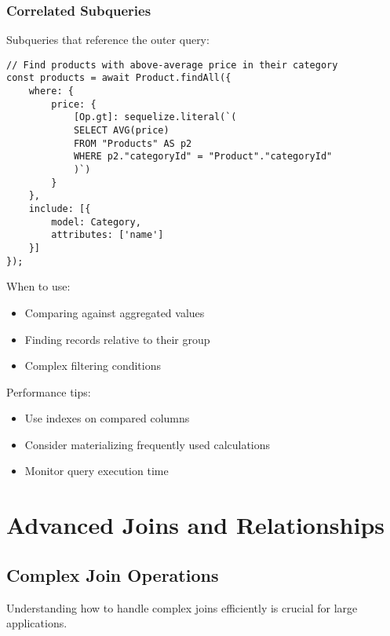 \documentclass[12pt,a4paper]{book}
\begin{document}
	\subsubsection{Correlated Subqueries}
	\begin{tcolorbox}[title=Correlated Subqueries]
		Subqueries that reference the outer query:
		
		\begin{verbatim}
// Find products with above-average price in their category
const products = await Product.findAll({
	where: {
		price: {
			[Op.gt]: sequelize.literal(`(
			SELECT AVG(price)
			FROM "Products" AS p2
			WHERE p2."categoryId" = "Product"."categoryId"
			)`)
		}
	},
	include: [{
		model: Category,
		attributes: ['name']
	}]
});
		\end{verbatim}
		
		When to use:
		\begin{itemize}
			\item Comparing against aggregated values
			\item Finding records relative to their group
			\item Complex filtering conditions
		\end{itemize}
		
		Performance tips:
		\begin{itemize}
			\item Use indexes on compared columns
			\item Consider materializing frequently used calculations
			\item Monitor query execution time
		\end{itemize}
	\end{tcolorbox}
	
	\section{Advanced Joins and Relationships}
	
	\subsection{Complex Join Operations}
	Understanding how to handle complex joins efficiently is crucial for large applications.
	
\end{document}
